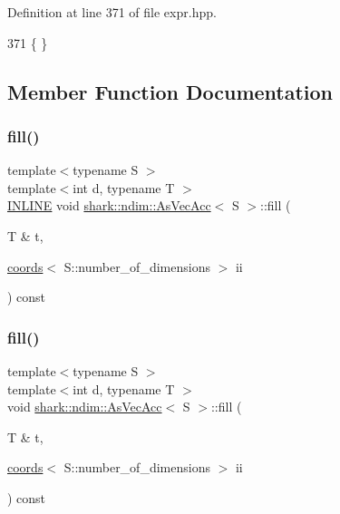 Definition at line 371 of file expr.\+hpp.


\begin{DoxyCode}
371 \{ \}
\end{DoxyCode}


\subsection{Member Function Documentation}
\hypertarget{classshark_1_1ndim_1_1_as_vec_acc_3_01_s_01_4_af5e77612a584d4ac77c8183cdfb2403f}{}\label{classshark_1_1ndim_1_1_as_vec_acc_3_01_s_01_4_af5e77612a584d4ac77c8183cdfb2403f} 
\subsubsection{\texorpdfstring{fill()}{fill()}\hspace{0.1cm}{\footnotesize\ttfamily [1/2]}}
{\footnotesize\ttfamily template$<$typename S $>$ \\
template$<$int d, typename T $>$ \\
\hyperlink{common_8hpp_a2eb6f9e0395b47b8d5e3eeae4fe0c116}{I\+N\+L\+I\+NE} void \hyperlink{classshark_1_1ndim_1_1_as_vec_acc}{shark\+::ndim\+::\+As\+Vec\+Acc}$<$ S $>$\+::fill (\begin{DoxyParamCaption}\item[{T \&}]{t,  }\item[{\hyperlink{structshark_1_1ndim_1_1coords}{coords}$<$ S\+::number\+\_\+of\+\_\+dimensions $>$}]{ii }\end{DoxyParamCaption}) const}

\hypertarget{classshark_1_1ndim_1_1_as_vec_acc_3_01_s_01_4_a643f03cf3988cc525365f2b91e32f6d0}{}\label{classshark_1_1ndim_1_1_as_vec_acc_3_01_s_01_4_a643f03cf3988cc525365f2b91e32f6d0} 
\subsubsection{\texorpdfstring{fill()}{fill()}\hspace{0.1cm}{\footnotesize\ttfamily [2/2]}}
{\footnotesize\ttfamily template$<$typename S $>$ \\
template$<$int d, typename T $>$ \\
void \hyperlink{classshark_1_1ndim_1_1_as_vec_acc}{shark\+::ndim\+::\+As\+Vec\+Acc}$<$ S $>$\+::fill (\begin{DoxyParamCaption}\item[{T \&}]{t,  }\item[{\hyperlink{structshark_1_1ndim_1_1coords}{coords}$<$ S\+::number\+\_\+of\+\_\+dimensions $>$}]{ii }\end{DoxyParamCaption}) const\hspace{0.3cm}{\ttfamily [inline]}}



